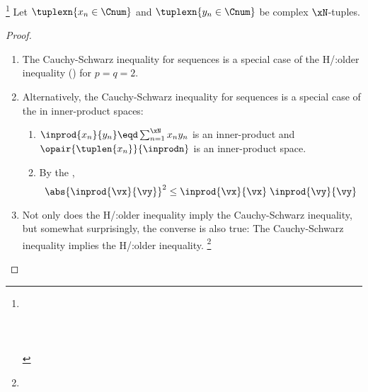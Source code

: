 \begin{theorem}
\footnote{
   \\
  \\
   \\
  \\
  }
\label{thm:seq_cs}
Let $\tuplexn{x_n\in\Cnum}$ and $\tuplexn{y_n\in\Cnum}$ be complex $\xN$-tuples. 
\end{theorem}
\begin{proof}
\begin{enumerate}
  \item The Cauchy-Schwarz inequality for sequences is a special case of the H/:older inequality ()
        for $p=q=2$.

  \item Alternatively, the Cauchy-Schwarz inequality for sequences is a special case of 
        the  in inner-product spaces:
    \begin{enumerate}
      \item $\inprod{x_n}{y_n}\eqd\sum_{n=1}^{\xN}x_n y_n$ is an inner-product and $\opair{\tuplen{x_n}}{\inprodn}$ is an inner-product space.
      \item By the , 
        \[\abs{\inprod{\vx}{\vy}}^2 \le \inprod{\vx}{\vx} \; \inprod{\vy}{\vy}\]
    \end{enumerate}

  \item Not only does the H/:older inequality imply the Cauchy-Schwarz inequality, but somewhat surprisingly,
        the converse is also true: The Cauchy-Schwarz inequality implies the H/:older inequality.%
        \footnote{
          }
\end{enumerate}
\end{proof}


